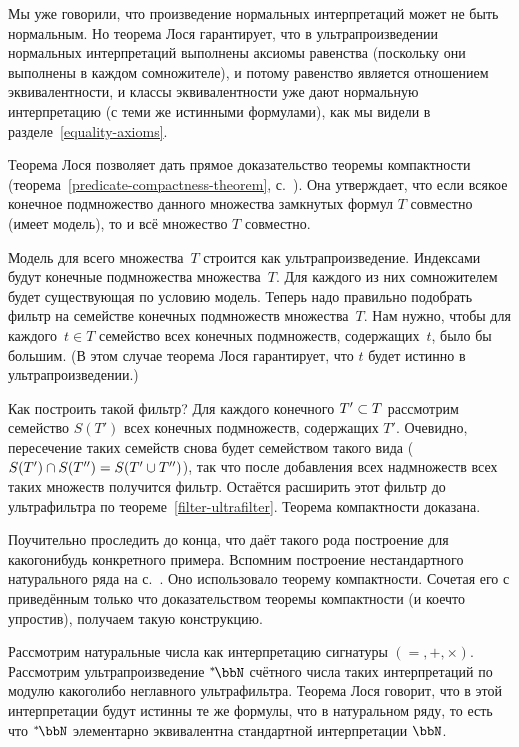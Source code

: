 Мы уже говорили, что произведение нормальных интерпретаций может
не быть нормальным. Но теорема Лося гарантирует, что в
ультрапроизведении нормальных интерпретаций выполнены аксиомы
равенства (поскольку они выполнены в каждом сомножителе), и
потому равенство является отношением эквивалентности, и классы
эквивалентности уже дают нормальную интерпретацию (с теми же
истинными формулами), как мы видели в
разделе~\ref{equality-axioms}.

Теорема Лося позволяет дать прямое доказательство теоремы
компактности (теорема~\ref{predicate-compactness-theorem},
с.~\pageref{predicate-compactness-theorem}). Она утверждает, что
если всякое конечное подмножество данного множества замкнутых
формул $T$ совместно (имеет модель), то и всё множество $T$
совместно.

Модель для всего множества~$T$ строится как ультрапроизведение.
Индексами будут конечные подмножества множества~$T$. Для каждого
из них сомножителем будет существующая по условию модель. Теперь
надо правильно подобрать фильтр на семействе конечных
подмножеств множества~$T$. Нам нужно, чтобы для каждого~$t\in
T$ семейство всех конечных подмножеств, содержащих~$t$, было бы
большим. (В этом случае теорема Лося гарантирует, что $t$ будет
истинно в ульт\-ра\-про\-из\-ведении.)

Как построить такой фильтр? Для каждого конечного $T'\hm\subset
T$ рассмотрим семейство $S(T')$ всех конечных подмножеств,
содержащих $T'$. Очевидно, пересечение таких семейств снова
будет семейством такого вида ($S(T')\hm\cap S(T'')=S(T'\hm\cup
T'')$), так что после добавления всех надмножеств всех таких
множеств получится фильтр. Остаётся расширить этот фильтр до
ультрафильтра по теореме~\ref{filter-ultrafilter}.
Теорема компактности доказана.

Поучительно проследить до конца, что даёт такого рода построение
для какого\д нибудь конкретного примера. Вспомним построение
нестандартного натурального ряда на
с.~\pageref{nonstandard-n-construction}. Оно использовало теорему
компактности. Сочетая его с приведённым только что доказательством
теоремы компактности (и кое\д что упростив), получаем такую
конструкцию.

Рассмотрим натуральные числа как интерпретацию сигнатуры
$({=},{+},{\times})$. Рассмотрим ультрапроизведение $\nstbb{\bbN}$
счётного числа таких интерпретаций по модулю какого\д либо
неглавного ультрафильтра. Теорема Лося говорит, что в этой
интерпретации будут истинны те же формулы, что в натуральном
ряду, то есть что $\nstbb{\bbN}$ элементарно эквивалентна стандартной
интерпретации $\bbN$.

